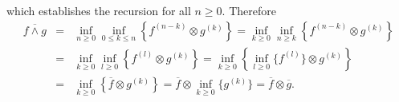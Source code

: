 which establishes the recursion for all $n \geq 0$. Therefore
\begin{eqnarray*}
\overline{ f \wedge g} & = & \inf_{n \geq 0} \inf_{0 \leq k \leq n} \left\{ f^{(n-k)} \otimes  g^{(k)} \right\}
             =  \inf_{k \geq 0} \inf_{n \geq k} \left\{ f^{(n-k)} \otimes  g^{(k)} \right\} \\
            & = &  \inf_{k \geq 0} \inf_{l \geq 0} \left\{ f^{(l)} \otimes  g^{(k)} \right\}
             =  \inf_{k \geq 0} \left\{ \inf_{l \geq 0} \{ f^{(l)} \} \otimes  g^{(k)} \right\} \\
            & = & \inf_{k \geq 0} \left\{ \overline{f} \otimes  g^{(k)} \right\}
             =  \overline{f} \otimes \inf_{k \geq 0} \{ g^{(k)} \} =
                 \overline{f} \otimes  \overline{g}.
\end{eqnarray*}


